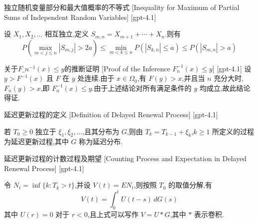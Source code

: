 \documentclass[UTF8]{ctexart}
\begin{document}
    
    
    \begin{thm}
        {独立随机变量部分和最大值概率的不等式}
        [Inequality for Maximum of Partial Sums of Independent Random Variables]
        [gpt-4.1]
        
设 $X_1, X_2, \dots$ 相互独立,定义 $S_{m, n} = X_{m+1} + \cdots + X_n$.则有
\[
P\left(\max_{m < j \leq n} |S_{m, j}| > 2a\right) \leq \min_{m < k \leq n} P(|S_{k, n}| \leq a) \leq P(|S_{m, n}| > a)
\]

    \end{thm}
    
    
    
    \begin{prf}
        {关于$F\_{n}^{-1}(x) \leq y$的推断证明}
        [Proof of the Inference $F_{n}^{-1}(x) \leq y$]
        [gpt-4.1]
        设 $y > F^{-1}(x)$ 且 $F$ 在 $y$ 处连续.由于 $x \in \Omega_{0}$,有 $F(y) > x$,并且当 $n$ 充分大时,$F_{n}(y) > x$,即 $F_{n}^{-1}(x) \leq y$.由于上述结论对所有满足条件的 $y$ 均成立,故此结论得证.
    \end{prf}
    
    
    
    \begin{dfn}
        {延迟更新过程的定义}
        [Definition of Delayed Renewal Process]
        [gpt-4.1]
        
若 $T_0 \geq 0$ 独立于 $\xi_1, \xi_2, \ldots$,且其分布为 $G$,则由 $T_k = T_{k-1} + \xi_k$,$k \geq 1$ 所定义的过程为延迟更新过程,其中 $G$ 称为延迟分布.

    \end{dfn}
    
    
    
    \begin{dfn}
        {延迟更新过程的计数过程及期望}
        [Counting Process and Expectation in Delayed Renewal Process]
        [gpt-4.1]
        
令 $N_t = \inf\{k : T_k > t\}$,并设 $V(t) = E N_t$,则按照 $T_0$ 的取值分解,有
\[
V(t) = \int_0^t U(t-s)\,dG(s)
\]
其中 $U(r) = 0$ 对于 $r < 0$,且上式可以写作 $V = U * G$,其中 $*$ 表示卷积.

    \end{dfn}
    
    
    
\end{document}
